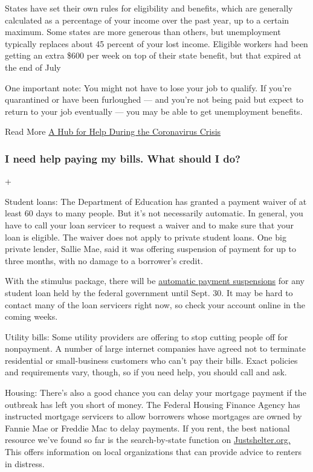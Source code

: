States have set their own rules for eligibility and benefits, which are
generally calculated as a percentage of your income over the past year,
up to a certain maximum. Some states are more generous than others, but
unemployment typically replaces about 45 percent of your lost income.
Eligible workers had been getting an extra \$600 per week on top of
their state benefit, but that expired at the end of July

One important note: You might not have to lose your job to qualify. If
you're quarantined or have been furloughed --- and you're not being paid
but expect to return to your job eventually --- you may be able to get
unemployment benefits.

 Read More
\href{https://www.nytimes3xbfgragh.onion/article/coronavirus-money-unemployment.html}{A
Hub for Help During the Coronavirus Crisis}

\hypertarget{i-need-help-paying-my-bills-what-should-i-do}{%
\subsubsection{I need help paying my bills. What should I
do?}\label{i-need-help-paying-my-bills-what-should-i-do}}

+

Student loans: The Department of Education has granted a payment waiver
of at least 60 days to many people. But it's not necessarily automatic.
In general, you have to call your loan servicer to request a waiver and
to make sure that your loan is eligible. The waiver does not apply to
private student loans. One big private lender, Sallie Mae, said it was
offering suspension of payment for up to three months, with no damage to
a borrower's credit.

With the stimulus package, there will be
\href{https://www.nytimes3xbfgragh.onion/article/coronavirus-stimulus-package-questions-answers.html}{automatic
payment suspensions} for any student loan held by the federal government
until Sept. 30. It may be hard to contact many of the loan servicers
right now, so check your account online in the coming weeks.

Utility bills: Some utility providers are offering to stop cutting
people off for nonpayment. A number of large internet companies have
agreed not to terminate residential or small-business customers who
can't pay their bills. Exact policies and requirements vary, though, so
if you need help, you should call and ask.

Housing: There's also a good chance you can delay your mortgage payment
if the outbreak has left you short of money. The Federal Housing Finance
Agency has instructed mortgage servicers to allow borrowers whose
mortgages are owned by Fannie Mae or Freddie Mac to delay payments. If
you rent, the best national resource we've found so far is the
search-by-state function on
\href{https://justshelter.org/community-resources/}{Justshelter.org.}
This offers information on local organizations that can provide advice
to renters in distress.

